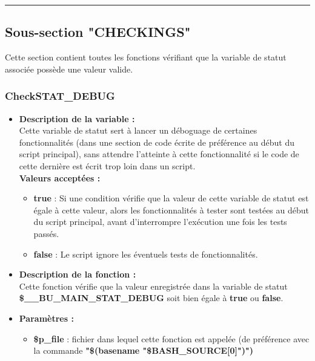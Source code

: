 \documentclass[a4paper,10pt]{article}
\begin{document}
\color{green}\par\noindent\rule{\textwidth}{0.4pt}\color{white}

\color{green}
\subsection{Sous-section "CHECKINGS"}\color{white}

Cette section contient toutes les fonctions vérifiant que la variable de statut associée possède une valeur valide.

\color{blue}
\subsubsection{CheckSTAT\_DEBUG}\color{white}
\begin{itemize}
    \item \textbf{Description de la variable :}\\
    Cette variable de statut sert à lancer un déboguage de certaines fonctionnalités (dans une section de code écrite de préférence au début du script principal), sans attendre l'atteinte à cette fonctionnalité si le code de cette dernière est écrit trop loin dans un script.\\[1\baselineskip]
    
    \textbf{Valeurs acceptées :}
    \begin{itemize}
        \item \textbf{true} : Si une condition vérifie que la valeur de cette variable de statut est égale à cette valeur, alors les fonctionnalités à tester sont testées au début du script principal, avant d'interrompre l'exécution une fois les tests passés.\\[1\baselineskip]

        \item \textbf{false} : Le script ignore les éventuels tests de fonctionnalités.\\[1\baselineskip]
    \end{itemize}

    \item \textbf{Description de la fonction :}\\
        Cette fonction vérifie que la valeur enregistrée dans la variable de statut \textbf{\color{orange}\$\_\_BU\_MAIN\_STAT\_DEBUG} soit bien égale à \textbf{true} ou \textbf{false}.\\[1\baselineskip]

    \item \textbf{Paramètres :}
    \begin{itemize}
        \item \color{orange}\textbf{\$p\_file}\color{white} : fichier dans lequel cette fonction est appelée (de préférence avec la commande \textbf{\textbf{"\$(\color{gray}basename \color{white}"\color{orange}\$BASH\_SOURCE[0]\color{white}")")}}\\[1\baselineskip]


\end{itemize}
\end{itemize}
\end{document}

